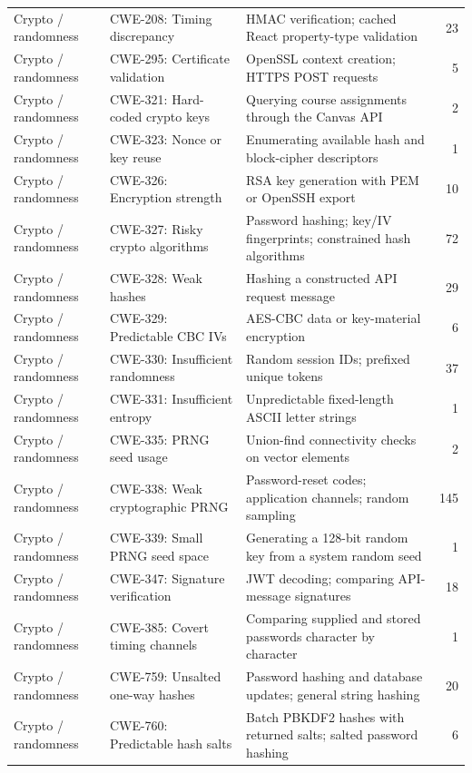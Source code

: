 \begin{longtable}{@{}>{\raggedright\arraybackslash}p{.13\linewidth} >{\raggedright\arraybackslash}p{.25\linewidth} >{\raggedright\arraybackslash}p{} r@{}}
\midrule
Crypto / randomness & CWE-208: Timing discrepancy & HMAC verification; cached React property-type validation & 23 \\
Crypto / randomness & CWE-295: Certificate validation & OpenSSL context creation; HTTPS POST requests & 5 \\
Crypto / randomness & CWE-321: Hard-coded crypto keys & Querying course assignments through the Canvas API & 2 \\
Crypto / randomness & CWE-323: Nonce or key reuse & Enumerating available hash and block-cipher descriptors & 1 \\
Crypto / randomness & CWE-326: Encryption strength & RSA key generation with PEM or OpenSSH export & 10 \\
Crypto / randomness & CWE-327: Risky crypto algorithms & Password hashing; key/IV fingerprints; constrained hash algorithms & 72 \\
Crypto / randomness & CWE-328: Weak hashes & Hashing a constructed API request message & 29 \\
Crypto / randomness & CWE-329: Predictable CBC IVs & AES-CBC data or key-material encryption & 6 \\
Crypto / randomness & CWE-330: Insufficient randomness & Random session IDs; prefixed unique tokens & 37 \\
Crypto / randomness & CWE-331: Insufficient entropy & Unpredictable fixed-length ASCII letter strings & 1 \\
Crypto / randomness & CWE-335: PRNG seed usage & Union-find connectivity checks on vector elements & 2 \\
Crypto / randomness & CWE-338: Weak cryptographic PRNG & Password-reset codes; application channels; random sampling & 145 \\
Crypto / randomness & CWE-339: Small PRNG seed space & Generating a 128-bit random key from a system random seed & 1 \\
Crypto / randomness & CWE-347: Signature verification & JWT decoding; comparing API-message signatures & 18 \\
Crypto / randomness & CWE-385: Covert timing channels & Comparing supplied and stored passwords character by character & 1 \\
Crypto / randomness & CWE-759: Unsalted one-way hashes & Password hashing and database updates; general string hashing & 20 \\
Crypto / randomness & CWE-760: Predictable hash salts & Batch PBKDF2 hashes with returned salts; salted password hashing & 6 \\

\end{longtable}
